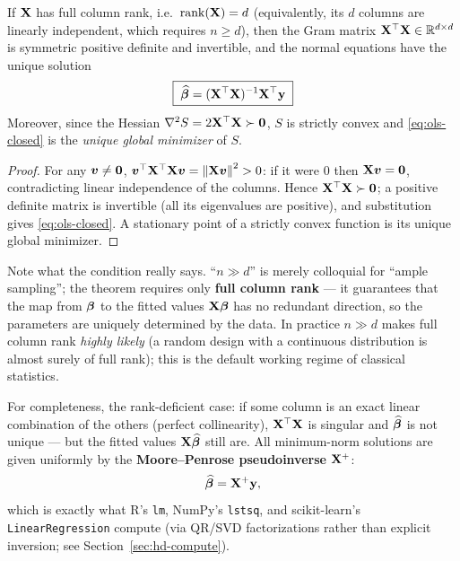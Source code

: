 \begin{theorem}\label{thm:closed-form}
If $\mathbf{X}$ has full column rank, i.e.\ $\mathrm{rank}(\mathbf{X}) = d$ (equivalently, its $d$ columns are linearly independent, which requires $n \ge d$), then the Gram matrix $\mathbf{X}^\top\mathbf{X} \in \mathbb{R}^{d \times d}$ is symmetric positive definite and invertible, and the normal equations have the unique solution
\begin{equation}\label{eq:ols-closed}
  \boxed{\;\widehat{\bm{\beta}} = (\mathbf{X}^\top \mathbf{X})^{-1} \mathbf{X}^\top \mathbf{y}\;}
\end{equation}
Moreover, since the Hessian $\nabla^2 S = 2 \mathbf{X}^\top \mathbf{X} \succ \mathbf{0}$, $S$ is strictly convex and \eqref{eq:ols-closed} is the \textit{unique global minimizer} of $S$.
\end{theorem}
\begin{proof}
For any $\bm{v} \neq \mathbf{0}$, $\bm{v}^\top \mathbf{X}^\top \mathbf{X} \bm{v} = \left\lVert \mathbf{X} \bm{v} \right\rVert^2 > 0$: if it were $0$ then $\mathbf{X}\bm{v} = \mathbf{0}$, contradicting linear independence of the columns. Hence $\mathbf{X}^\top\mathbf{X} \succ \mathbf{0}$; a positive definite matrix is invertible (all its eigenvalues are positive), and substitution gives \eqref{eq:ols-closed}. A stationary point of a strictly convex function is its unique global minimizer.
\end{proof}

Note what the condition really says. ``$n \gg d$'' is merely colloquial for ``ample sampling''; the theorem requires only \textbf{full column rank} — it guarantees that the map from $\bm{\beta}$ to the fitted values $\mathbf{X}\bm{\beta}$ has no redundant direction, so the parameters are uniquely determined by the data. In practice $n \gg d$ makes full column rank \textit{highly likely} (a random design with a continuous distribution is almost surely of full rank); this is the default working regime of classical statistics.

For completeness, the rank-deficient case: if some column is an exact linear combination of the others (perfect collinearity), $\mathbf{X}^\top\mathbf{X}$ is singular and $\widehat{\bm{\beta}}$ is not unique — but the fitted values $\mathbf{X}\widehat{\bm{\beta}}$ still are. All minimum-norm solutions are given uniformly by the \textbf{Moore--Penrose pseudoinverse} $\mathbf{X}^+$\cite{penrose1955}:
\begin{equation}\label{eq:pseudo}
  \widehat{\bm{\beta}} = \mathbf{X}^+ \mathbf{y},
\end{equation}
which is exactly what R's \texttt{lm}, NumPy's \texttt{lstsq}, and scikit-learn's \texttt{LinearRegression} compute (via QR/SVD factorizations rather than explicit inversion; see Section~\ref{sec:hd-compute}).

